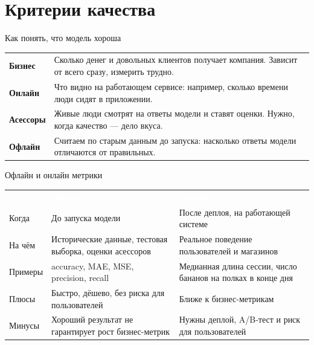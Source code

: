 \section{Критерии качества}

\begin{frame}[c]{Как понять, что модель хороша}
  \small
  \begin{tabular}{>{\raggedright\arraybackslash}p{}>{\raggedright\arraybackslash}p{}}
    \textcolor{acMid}{\textbf{Бизнес}} & Сколько денег и довольных клиентов получает компания. Зависит от всего сразу, измерить трудно.\\
    \textcolor{acMid}{\textbf{Онлайн}} & Что видно на работающем сервисе: например, сколько времени люди сидят в приложении.\\
    \textcolor{acMid}{\textbf{Асессоры}} & Живые люди смотрят на ответы модели и ставят оценки. Нужно, когда качество --- дело вкуса.\\
    \textcolor{acMid}{\textbf{Офлайн}} & Считаем по старым данным до запуска: насколько ответы модели отличаются от правильных.\\
  \end{tabular}
\end{frame}

\begin{frame}[c]{Офлайн и онлайн метрики}
  \small
  \small
  \begin{tabular}{>{\raggedright\arraybackslash}p{}>{\raggedright\arraybackslash}p{}>{\raggedright\arraybackslash}p{}}
    \rowcolor{acDark} & \textcolor{white}{\textbf{Офлайн}} & \textcolor{white}{\textbf{Онлайн}}\\
    Когда & До запуска модели & После деплоя, на работающей системе\\
    На чём & Исторические данные, тестовая выборка, оценки асессоров & Реальное поведение пользователей и магазинов\\
    Примеры & accuracy, MAE, MSE, precision, recall & Медианная длина сессии, число бананов на полках в конце дня\\
    Плюсы & Быстро, дёшево, без риска для пользователей & Ближе к бизнес-метрикам\\
    Минусы & Хороший результат не гарантирует рост бизнес-метрик & Нужны деплой, A/B-тест и риск для пользователей\\
  \end{tabular}
\end{frame}


